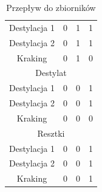 \documentclass{article}
\begin{document}
\begin{table}[h!]
\begin{minipage}{0.45\textwidth}
\begin{tabular}{cccc}
            \hline
            Destylacja 1 & 0 & 1 & 1 \\
            Destylacja 2 & 0 & 1 & 1 \\
            Kraking & 0 & 1 & 0 \\
            \multicolumn{4}{c}{Destylat} \\
            \hline
            Destylacja 1 & 0 & 0 & 1 \\
            Destylacja 2 & 0 & 0 & 1 \\
            Kraking & 0 & 0 & 0 \\
            \multicolumn{4}{c}{Resztki} \\
            \hline
            Destylacja 1 & 0 & 0 & 1 \\
            Destylacja 2 & 0 & 0 & 1 \\
            Kraking & 0 & 0 & 1 \\
        \end{tabular}
        \caption{Przepływ do zbiorników}
        \label{tab:przeplyw_do_zbiornikow}
    \end{minipage}
\end{table}
\end{document}
